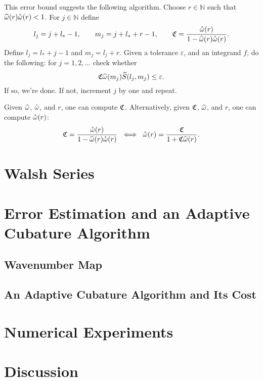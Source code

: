 \documentclass[graybox,footinfo]{svmult}
\newcommand{\N}{\mathbb{N}} %
\begin{document}
This error bound suggests the following algorithm.  Choose $r \in \N$ such that $\widehat{\omega}(r)\mathring{\omega}(r)<1$.  For $j \in \N$ define
\[
l_j=j+l_*-1, \qquad  m_j=j+l_*+r-1, \qquad  \mathfrak{C} = \frac{\mathring{\omega}(r)}{1 - \widehat{\omega}(r)\mathring{\omega}(r)}.
\]
Define $l_j=l_*+j-1$ and $m_j=l_j+r$.  Given a tolerance $\varepsilon$, and an integrand $f$, do the following:  for $j=1, 2, \ldots$ check whether
\[
\mathfrak{C} \widehat{\omega}(m_j)  \widetilde{S}(l_j,m_j) \le \varepsilon.
\]
If so, we're done.  If not, increment $j$ by one and repeat.

Given $\widehat{\omega}$, $\mathring{\omega}$, and $r$, one can compute $\mathfrak{C}$.  Alternatively, given $\mathfrak{C}$, $\widehat{\omega}$, and $r$, one can compute $\mathring{\omega}(r)$:
\[
\mathfrak{C} = \frac{\mathring{\omega}(r)}{1 - \widehat{\omega}(r)\mathring{\omega}(r)} \ \iff \ \mathring{\omega}(r)= \frac{\mathfrak{C}}{1+\mathfrak{C}\widehat{\omega}(r)}.
\]


\section{Walsh Series} \label{WaveWalshsec}

\section{Error Estimation and an Adaptive Cubature Algorithm} \label{ErrEstsec}

\subsection{Wavenumber Map} \label{wavenummapsec}

\subsection{An Adaptive Cubature Algorithm and Its Cost}

\section{Numerical Experiments} \label{numexpsec}


\section{Discussion}


\begin{acknowledgement}
\end{acknowledgement}



\end{document}
